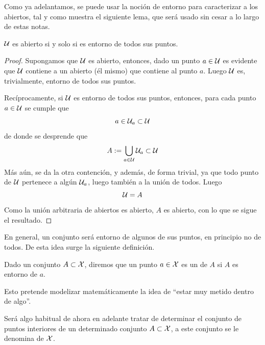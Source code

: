 Como ya adelantamos, se puede usar la noción de entorno para caracterizar a los abiertos, tal y como muestra el siguiente lema, que será usado sin cesar a lo largo de estas notas.
\begin{lem}
	\label{etop_lem_caracterizacionAbiertos}
	$\mathcal{U}$ es abierto si y solo si es entorno de todos sus puntos.
\end{lem}
\begin{proof}
	Supongamos que $\mathcal{U}$ es abierto, entonces, dado un punto $a\in\mathcal{U}$ es evidente que $\mathcal{U}$ contiene a un abierto (él mismo) que contiene al punto $a$. Luego $\mathcal{U}$ es, trivialmente, entorno de todos sus puntos.
	
	Recíprocamente, si $\mathcal{U}$ es entorno de todos sus puntos, entonces, para cada punto $a\in\mathcal{U}$ se cumple que
	\begin{equation*}
	a\in\mathcal{U}_a\subset\mathcal{U}
	\end{equation*}
	de donde se desprende que
	\begin{equation*}
	A:=\bigcup_{a\in\mathcal{U}}\mathcal{U}_a\subset\mathcal{U}
	\end{equation*}
	Más aún, se da la otra contención, y además, de forma trivial, ya que todo punto de $\mathcal{U}$ pertenece a algún $\mathcal{U}_a$, luego también a la unión de todos. Luego
	\begin{equation*}
	\mathcal{U}=A
	\end{equation*}
	Como la unión arbitraria de abiertos es abierto, $A$ es abierto, con lo que se sigue el resultado.
\end{proof}
En general, un conjunto será entorno de algunos de sus puntos, en principio no de todos. De esta idea surge la siguiente definición.
\begin{defi}
	\label{etop_def_puntoInterior}
	Dado un conjunto $A\subset\mathcal{X}$, diremos que un punto $a\in\mathcal{X}$ es un  de $A$ si $A$ es entorno de $a$.
\end{defi}

Esto pretende modelizar matemáticamente la idea de ``estar muy metido dentro de algo''.

Será algo habitual de ahora en adelante tratar de determinar el conjunto de puntos interiores de un determinado conjunto $A\subset\mathcal{X}$, a este conjunto se le denomina  de $\mathcal{X}$.


